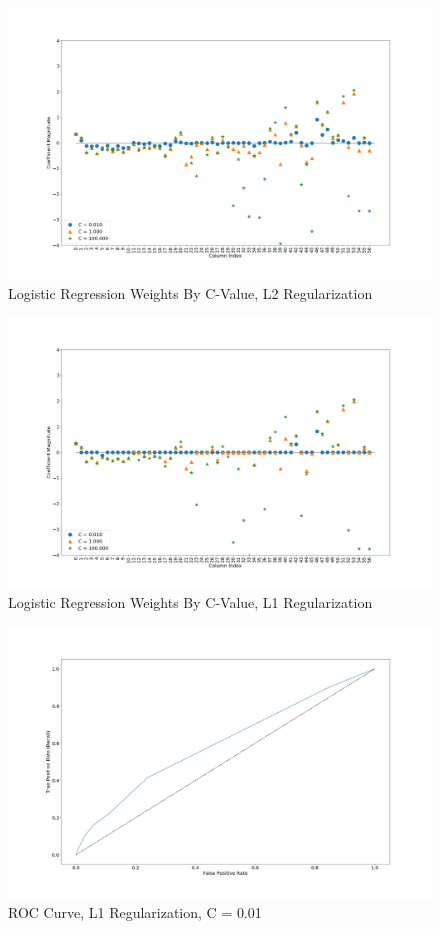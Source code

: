 \documentclass[sigconf]{acmart}
\begin{document}
\begin{figure}[!ht]
  \centering\includegraphics[width=\columnwidth]{images/weightsl2.png}
  \caption{Logistic Regression Weights By C-Value, L2 Regularization}\label{f:weightsl2}
\end{figure}

\begin{figure}[!ht]
  \centering\includegraphics[width=\columnwidth]{images/weightsl1.png}
  \caption{Logistic Regression Weights By C-Value, L1 Regularization}\label{f:weightsl1}
\end{figure}

\begin{figure}[!ht]
  \centering\includegraphics[width=\columnwidth]{images/roccurve001.png}
  \caption{ROC Curve, L1 Regularization, C = 0.01}\label{f:roccurve001}
\end{figure}
\end{document}
